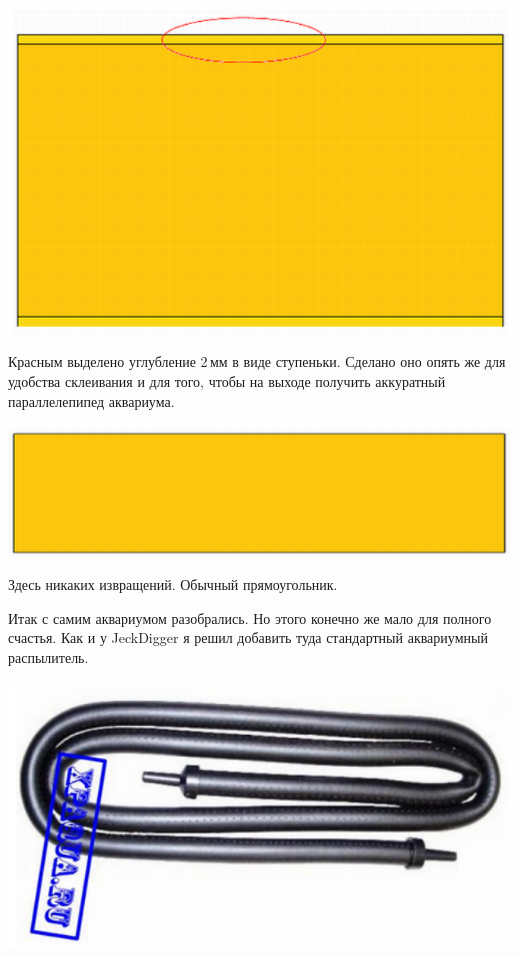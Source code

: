 \documentclass{magazine}
\begin{document}
{\noindent\includegraphics[width=\columnwidth]{fig/00/smit/ee000019.png}

Красным выделено углубление 2\,мм в виде ступеньки. Сделано оно опять же для
удобства склеивания и для того, чтобы на выходе получить аккуратный
параллелепипед аквариума. \smiley

\noindent\includegraphics[width=\columnwidth]{fig/00/smit/ee000020.png}

Здесь никаких извращений. Обычный прямоугольник. \smiley
\bigskip

Итак с самим аквариумом разобрались. Но этого конечно же мало для полного
счастья. Как и у JeckDigger я решил добавить туда стандартный аквариумный
распылитель.

\noindent\includegraphics[width=\columnwidth]{fig/00/smit/ee000021.png}

}
\end{document}
